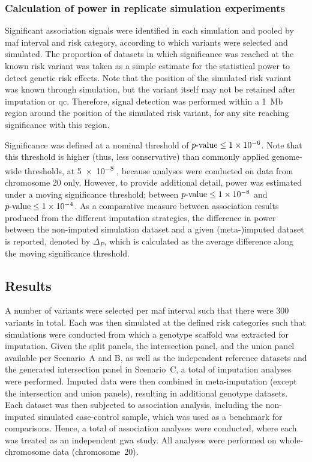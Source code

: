 %
\subsubsection{Calculation of power in replicate simulation experiments}
%

Significant association signals were identified in each simulation and pooled by \gls{maf} interval and risk category, according to which variants were selected and simulated.
The proportion of datasets in which significance was reached at the known risk variant was taken as a simple estimate for the statistical power to detect genetic risk effects.
Note that the position of the simulated risk variant was known through simulation, but the variant itself may not be retained after imputation or \gls{qc}.
Therefore, signal detection was performed within a 1~\gls{Mb} region around the position of the simulated risk variant, for any site reaching significance with this region.

Significance was defined at a nominal threshold of ${\mbox{$p$-value}\leq1\times10^{-6}}$.
Note that this threshold is higher (thus, less conservative) than commonly applied genome-wide thresholds, \eg at \num{5e-8} \citep[\eg, see][]{Risch:1996ub}, because analyses were conducted on data from chromosome 20 only.
However, to provide additional detail, power was estimated under a moving significance threshold; between ${\mbox{$p$-value}\leq1\times10^{-8}}$ and ${\mbox{$p$-value}\leq1\times10^{-4}}$.
As a comparative measure between association results produced from the different imputation strategies,
the difference in power between the non-imputed simulation dataset and a given (meta-)imputed dataset is reported, denoted by ${\Delta_P}$, which is calculated as the average difference along the moving significance threshold.


%
\subsection{Results}
\label{sec:meta_power_results}
%

A number of  variants were selected per \gls{maf} interval such that there were 300 variants in total.
Each was then simulated at the  defined risk categories such that  simulations were conducted
from which a genotype scaffold was extracted for imputation.
Given the  split panels, the intersection panel, and the union panel available per Scenario~A and B, as well as the  independent reference datasets and the generated intersection panel in Scenario~C, a total of  imputation analyses were performed.
Imputed data were then combined in meta-imputation (except the intersection and union panels), resulting in  additional genotype datasets.
Each dataset was then subjected to association analysis, including the non-imputed simulated case-control sample, which was used as a benchmark for comparisons.
Hence, a total of  association analyses were conducted, where each was treated as an independent \gls{gwa} study.
All analyses were performed on whole-chromosome data (chromosome~20).


